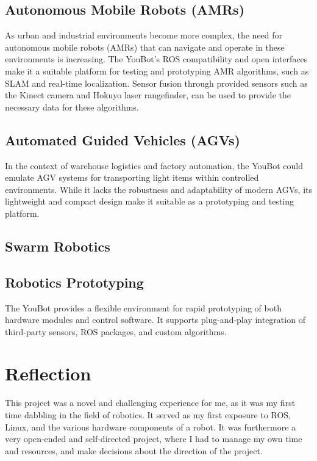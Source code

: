 \documentclass[a4paper, 12pt]{article}
\begin{document}
    \subsection{Autonomous Mobile Robots (AMRs)}
    As urban and industrial environments become more complex, the need for autonomous mobile robots (AMRs) that can navigate and operate in these environments is increasing. The YouBot's ROS compatibility and open interfaces make it a suitable platform for testing and prototyping AMR algorithms, such as SLAM and real-time localization. Sensor fusion through provided sensors such as the Kinect camera and Hokuyo laser rangefinder, can be used to provide the necessary data for these algorithms.

    \subsection{Automated Guided Vehicles (AGVs)}

    In the context of warehouse logistics and factory automation, the YouBot could emulate AGV systems for transporting light items within controlled environments. While it lacks the robustness and adaptability of modern AGVs, its lightweight and compact design make it suitable as a prototyping and testing platform. 

    \subsection{Swarm Robotics}

    \subsection{Robotics Prototyping}

    The YouBot provides a flexible environment for rapid prototyping of both hardware modules and control software. It supports plug-and-play integration of third-party sensors, ROS packages, and custom algorithms. 

    \pagebreak

    \section{Reflection}

    This project was a novel and challenging experience for me, as it was my first time dabbling in the field of robotics. It served as my first exposure to ROS, Linux, and the various hardware components of a robot. It was furthermore a very open-ended and self-directed project, where I had to manage my own time and resources, and make decisions about the direction of the project.
\end{document}
